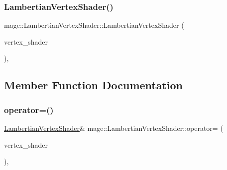 \hypertarget{classmage_1_1_lambertian_vertex_shader_a1202feaaeb64148207e2fb10290a09c8}{}\label{classmage_1_1_lambertian_vertex_shader_a1202feaaeb64148207e2fb10290a09c8} 
\subsubsection{\texorpdfstring{Lambertian\+Vertex\+Shader()}{LambertianVertexShader()}\hspace{0.1cm}{\footnotesize\ttfamily [3/3]}}
{\footnotesize\ttfamily mage\+::\+Lambertian\+Vertex\+Shader\+::\+Lambertian\+Vertex\+Shader (\begin{DoxyParamCaption}\item[{\hyperlink{classmage_1_1_lambertian_vertex_shader}{Lambertian\+Vertex\+Shader} \&\&}]{vertex\+\_\+shader }\end{DoxyParamCaption})\hspace{0.3cm}{\ttfamily [private]}, {\ttfamily [delete]}}



\subsection{Member Function Documentation}
\hypertarget{classmage_1_1_lambertian_vertex_shader_a974b43346ab5d8081d9101f715e7670d}{}\label{classmage_1_1_lambertian_vertex_shader_a974b43346ab5d8081d9101f715e7670d} 
\subsubsection{\texorpdfstring{operator=()}{operator=()}\hspace{0.1cm}{\footnotesize\ttfamily [1/2]}}
{\footnotesize\ttfamily \hyperlink{classmage_1_1_lambertian_vertex_shader}{Lambertian\+Vertex\+Shader}\& mage\+::\+Lambertian\+Vertex\+Shader\+::operator= (\begin{DoxyParamCaption}\item[{const \hyperlink{classmage_1_1_lambertian_vertex_shader}{Lambertian\+Vertex\+Shader} \&}]{vertex\+\_\+shader }\end{DoxyParamCaption})\hspace{0.3cm}{\ttfamily [private]}, {\ttfamily [delete]}}

